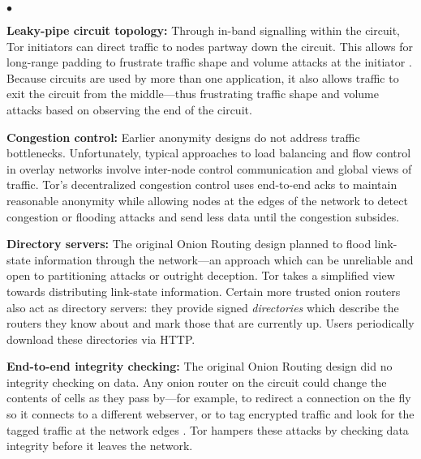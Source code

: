 \documentclass[times,10pt,twocolumn]{article}
\newenvironment{tightlist}{\begin{list}{$\bullet$}{
  \setlength{\itemsep}{0mm}
    \setlength{\parsep}{0mm}
    }}{\end{list}}
\begin{document}
\begin{tightlist}
\item \textbf{Leaky-pipe circuit topology:} Through in-band
  signalling within the
  circuit, Tor initiators can direct traffic to nodes partway down the
  circuit. This allows for long-range padding to frustrate traffic
  shape and volume attacks at the initiator \cite{defensive-dropping}.
  Because circuits are used by more than one application, it also
  allows traffic to exit the circuit from the middle---thus
  frustrating traffic shape and volume attacks based on observing the
  end of the circuit.

\item \textbf{Congestion control:} Earlier anonymity designs do not
address traffic bottlenecks. Unfortunately, typical approaches to load
balancing and flow control in overlay networks involve inter-node control
communication and global views of traffic. Tor's decentralized congestion
control uses end-to-end acks to maintain reasonable anonymity while
allowing nodes
at the edges of the network to detect congestion or flooding attacks
and send less data until the congestion subsides.

\item \textbf{Directory servers:} The original Onion Routing design
planned to flood link-state information through the network---an
approach which can be unreliable and
open to partitioning attacks or outright deception. Tor takes a simplified
view towards distributing link-state information. Certain more trusted
onion routers also act as directory servers: they provide signed
\emph{directories} which describe the routers they know about and mark
those that
are currently up. Users periodically download these directories via HTTP.

\item \textbf{End-to-end integrity checking:} The original Onion Routing
design did no integrity checking on data. Any onion router on the circuit
could change the contents of cells as they pass by---for example, to
redirect a
connection on the fly so it connects to a different webserver, or to
tag encrypted traffic and look for the tagged traffic at the network
edges \cite{minion-design}.  Tor hampers these attacks by checking data
integrity before it leaves the network.


\end{tightlist}
\end{document}
